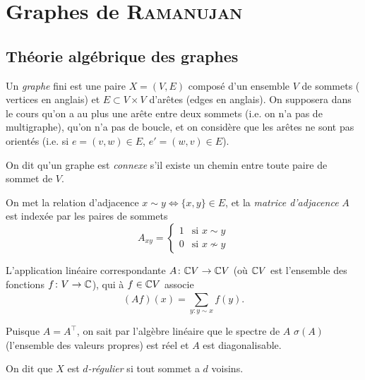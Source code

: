 
\chapter{Graphes de \textsc{Ramanujan}}
\label{cha:graph-de-ramanujan}

\section{Théorie algébrique des graphes}
\label{sec:theor-algebr-des-graphes}

Un \emph{graphe} fini est une paire $X = (V,E)$ composé d'un ensemble $V$ de sommets (\og
vertices\fg{} en anglais) et $E \subset V \times V$ d'arêtes (\og edges\fg{} en anglais). On supposera dans le
cours qu'on a au plus une arête entre deux sommets (i.e. on n'a pas de multigraphe), qu'on n'a pas de boucle,
et on considère que les arêtes ne sont pas orientés (i.e. si $e = (v,w) \in E$, $e' = (w,v) \in E$).

On dit qu'un graphe est \emph{connexe} s'il existe un chemin entre toute paire de sommet de
$V$.

On met la relation d'adjacence $x \sim y \iff \{x, y\} \in E$, et la \emph{matrice d'adjacence} $A$ est indexée par les paires de sommets 
\[ A_{xy} =
  \begin{cases}
    1 & \text{si } x \sim y\\
    0 & \text{si } x \not\sim y
  \end{cases}
\]

L'application linéaire correspondante $A \colon \mathbb{C} V \to \mathbb{C} V$ (où $\mathbb{C} V$ est l'ensemble des fonctions $f
\colon V \to \mathbb{C}$), qui à $f \in \mathbb{C} V$ associe 
\[ (A f)(x) = \sum_{y \colon y \sim x}^{}f(y). \]

Puisque $A = A^\top$, on sait par l'algèbre linéaire que le spectre de $A$ $\sigma(A)$ (l'ensemble des valeurs
propres) est réel et $A$ est diagonalisable.

On dit que $X$ est \emph{$d$-régulier} si tout sommet a $d$ voisins.

